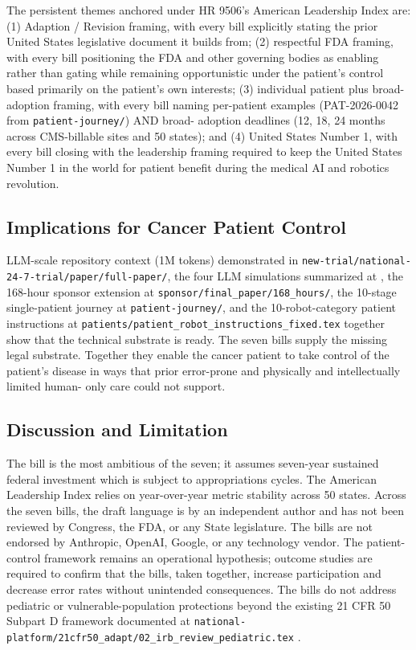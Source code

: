 The persistent themes anchored under HR 9506's American Leadership
Index are: (1) Adaption / Revision framing, with every bill
explicitly stating the prior United States legislative document it
builds from; (2) respectful FDA framing, with every bill positioning
the FDA and other governing bodies as enabling rather than gating
while remaining opportunistic under the patient's control based
primarily on the patient's own interests; (3) individual patient
plus broad-adoption framing, with every bill naming per-patient
examples (PAT-2026-0042 from \texttt{patient-journey/}) AND broad-
adoption deadlines (12, 18, 24 months across CMS-billable sites and
50 states); and (4) United States Number 1, with every bill closing
with the leadership framing required to keep the United States
Number 1 in the world for patient benefit during the medical AI and
robotics revolution.

\subsection{Implications for Cancer Patient Control}

LLM-scale repository context (1M tokens) demonstrated in
\texttt{new-trial/national-24-7-trial/paper/full-paper/}, the four
LLM simulations summarized at \cite{kawchak_2026_19994945}, the
168-hour sponsor extension at \texttt{sponsor/final\_paper/168\_hours/},
the 10-stage single-patient journey at \texttt{patient-journey/},
and the 10-robot-category patient instructions at
\texttt{patients/patient\_robot\_instructions\_fixed.tex} together
show that the technical substrate is ready. The seven bills supply
the missing legal substrate. Together they enable the cancer
patient to take control of the patient's disease in ways that
prior error-prone and physically and intellectually limited human-
only care could not support.

\subsection{Discussion and Limitation}

The bill is the most ambitious of the seven; it assumes seven-year
sustained federal investment which is subject to appropriations
cycles. The American Leadership Index relies on year-over-year
metric stability across 50 states. Across the seven bills, the
draft language is by an independent author and has not been
reviewed by Congress, the FDA, or any State legislature. The bills
are not endorsed by Anthropic, OpenAI, Google, or any technology
vendor. The patient-control framework remains an operational
hypothesis; outcome studies are required to confirm that the
bills, taken together, increase participation and decrease error
rates without unintended consequences. The bills do not address
pediatric or vulnerable-population protections beyond the existing
21 CFR 50 Subpart D framework documented at
\texttt{national-platform/21cfr50\_adapt/02\_irb\_review\_pediatric.tex}
\cite{rank4_fdora_fda_modernization_2022, kawchak_2026_19040707}.

